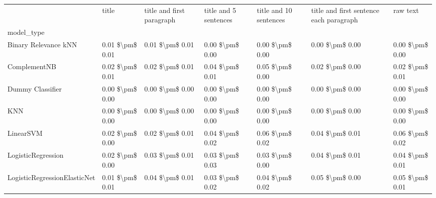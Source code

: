 \begin{tabular}{lllllll}
\toprule
{} &            title & title and first paragraph & title and 5 sentences & title and 10 sentences & title and first sentence each paragraph &             raw text \\
model\_type                      &                  &                           &                       &                        &                                         &                      \\
\midrule
Binary Relevance kNN            &  0.01 \$\textbackslash pm\$ 0.01 &           0.01 \$\textbackslash pm\$ 0.01 &       0.00 \$\textbackslash pm\$ 0.00 &        0.00 \$\textbackslash pm\$ 0.00 &                         0.00 \$\textbackslash pm\$ 0.00 &      0.00 \$\textbackslash pm\$ 0.00 \\
ComplementNB                    &  0.02 \$\textbackslash pm\$ 0.01 &           0.02 \$\textbackslash pm\$ 0.01 &       0.04 \$\textbackslash pm\$ 0.01 &        0.05 \$\textbackslash pm\$ 0.00 &                         0.02 \$\textbackslash pm\$ 0.00 &      0.02 \$\textbackslash pm\$ 0.01 \\
Dummy Classifier                &  0.00 \$\textbackslash pm\$ 0.00 &           0.00 \$\textbackslash pm\$ 0.00 &       0.00 \$\textbackslash pm\$ 0.00 &        0.00 \$\textbackslash pm\$ 0.00 &                         0.00 \$\textbackslash pm\$ 0.00 &      0.00 \$\textbackslash pm\$ 0.00 \\
KNN                             &  0.00 \$\textbackslash pm\$ 0.00 &           0.00 \$\textbackslash pm\$ 0.00 &       0.00 \$\textbackslash pm\$ 0.00 &        0.00 \$\textbackslash pm\$ 0.00 &                         0.00 \$\textbackslash pm\$ 0.00 &      0.00 \$\textbackslash pm\$ 0.00 \\
LinearSVM                       &  0.02 \$\textbackslash pm\$ 0.00 &           0.02 \$\textbackslash pm\$ 0.01 &       0.04 \$\textbackslash pm\$ 0.02 &        0.06 \$\textbackslash pm\$ 0.02 &                         0.04 \$\textbackslash pm\$ 0.01 &      0.06 \$\textbackslash pm\$ 0.02 \\
LogisticRegression              &  0.02 \$\textbackslash pm\$ 0.00 &           0.03 \$\textbackslash pm\$ 0.01 &       0.03 \$\textbackslash pm\$ 0.03 &        0.03 \$\textbackslash pm\$ 0.00 &                         0.04 \$\textbackslash pm\$ 0.01 &      0.04 \$\textbackslash pm\$ 0.01 \\
LogisticRegressionElasticNet    &  0.01 \$\textbackslash pm\$ 0.01 &           0.04 \$\textbackslash pm\$ 0.01 &       0.03 \$\textbackslash pm\$ 0.02 &        0.04 \$\textbackslash pm\$ 0.02 &                         0.05 \$\textbackslash pm\$ 0.00 &      0.05 \$\textbackslash pm\$ 0.01 \\

\end{tabular}
